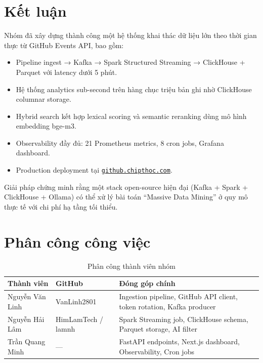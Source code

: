 \documentclass[12pt,a4paper]{article}
\newcommand{\tech}[1]{\texttt{#1}}
\begin{document}
\section{Kết luận}

Nhóm đã xây dựng thành công một hệ thống khai thác dữ liệu lớn
theo thời gian thực từ GitHub Events API, bao gồm:

\begin{itemize}[leftmargin=1.5em]
  \item Pipeline ingest → Kafka → Spark Structured Streaming → ClickHouse
        + Parquet với latency dưới 5 phút.
  \item Hệ thống analytics sub-second trên hàng chục triệu bản ghi
        nhờ ClickHouse columnar storage.
  \item Hybrid search kết hợp lexical scoring và semantic reranking
        dùng mô hình embedding bge-m3.
  \item Observability đầy đủ: 21 Prometheus metrics, 8 cron jobs,
        Grafana dashboard.
  \item Production deployment tại
        \href{https://github.chipthoc.com/}{\tech{github.chipthoc.com}}.
\end{itemize}

Giải pháp chứng minh rằng một stack open-source hiện đại
(Kafka + Spark + ClickHouse + Ollama) có thể xử lý bài toán
``Massive Data Mining'' ở quy mô thực tế với chi phí hạ tầng tối thiểu.

\section*{Phân công công việc}

\begin{table}[H]
  \centering
  \caption{Phân công thành viên nhóm}
  \begin{tabularx}{\linewidth}{p{3.5cm}p{2.5cm}X}
    \toprule
    \textbf{Thành viên} & \textbf{GitHub} & \textbf{Đóng góp chính} \\
    \midrule
    Nguyễn Văn Linh & VanLinh2801
      & Ingestion pipeline, GitHub API client, token rotation, Kafka producer \\
    Nguyễn Hải Lâm     & HimLamTech / lamnh
      & Spark Streaming job, ClickHouse schema, Parquet storage, AI filter \\
    Trần Quang Minh  & ---
      & FastAPI endpoints, Next.js dashboard, Observability, Cron jobs \\
    \bottomrule
  \end{tabularx}
\end{table}
\end{document}
